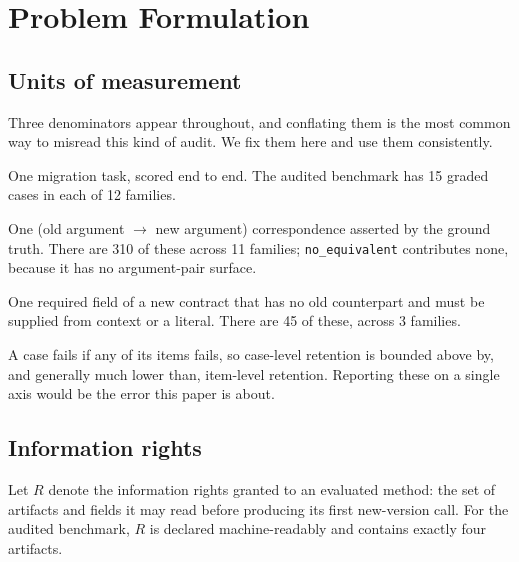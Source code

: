 \documentclass[11pt]{article}
\newcommand{\dfam}[1]{\texttt{#1}}
\begin{document}
\section{Problem Formulation}

\subsection{Units of measurement}
\label{sec:units}

Three denominators appear throughout, and conflating them is the most common
way to misread this kind of audit. We fix them here and use them consistently.

\begin{description}[style=nextline,leftmargin=1.2em]
  \item[Graded case] One migration task, scored end to end. The audited
  benchmark has 15 graded cases in each of 12 families.
  \item[Argument-pair item] One (old argument $\rightarrow$ new argument)
  correspondence asserted by the ground truth. There are 310 of these across
  11 families; \dfam{no\_equivalent} contributes none, because it has no
  argument-pair surface.
  \item[Required-field item] One required field of a new contract that has no
  old counterpart and must be supplied from context or a literal. There are 45
  of these, across 3 families.
\end{description}

A case fails if any of its items fails, so case-level retention is bounded
above by, and generally much lower than, item-level retention. Reporting
these on a single axis would be the error this paper is about.

\subsection{Information rights}

Let $R$ denote the information rights granted to an evaluated method: the set
of artifacts and fields it may read before producing its first new-version
call. For the audited benchmark, $R$ is declared machine-readably and
contains exactly four artifacts.
\end{document}
